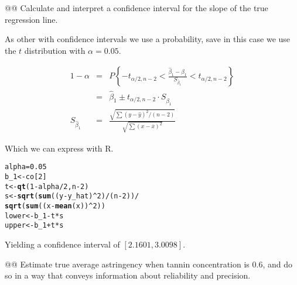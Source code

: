 \documentclass[10pt]{article}\usepackage[]{graphicx}\usepackage[]{xcolor}
\makeatletter
\newcommand{\hlnum}[1]{\textcolor[rgb]{0.686,0.059,0.569}{#1}}%
\newcommand{\hlopt}[1]{\textcolor[rgb]{0,0,0}{#1}}%
\newcommand{\hlstd}[1]{\textcolor[rgb]{0.345,0.345,0.345}{#1}}%
\newcommand{\hlkwb}[1]{\textcolor[rgb]{0.69,0.353,0.396}{#1}}%
\newcommand{\hlkwd}[1]{\textcolor[rgb]{0.737,0.353,0.396}{\textbf{#1}}}%
\newenvironment{kframe}{%
 \def\at@end@of@kframe{}%
 \ifinner\ifhmode%
  \def\at@end@of@kframe{\end{minipage}}%
  \begin{minipage}{\columnwidth}%
 \fi\fi%
 \def\FrameCommand##1{\hskip\@totalleftmargin \hskip-\fboxsep
 \colorbox{shadecolor}{##1}\hskip-\fboxsep
     \hskip-\linewidth \hskip-\@totalleftmargin \hskip\columnwidth}%
 \MakeFramed {\advance\hsize-\width
   \@totalleftmargin\z@ \linewidth\hsize
   \@setminipage}}%
 {\par\unskip\endMakeFramed%
 \at@end@of@kframe}
\newenvironment{knitrout}{}{} %
\makeatother
\begin{document}
\begin{easylist}[enumerate]
    @@ Calculate and interpret a confidence interval for the slope of the true regression line.\newline

    As other with confidence intervals we use a probability, save in this case we use the $t$ distribution with
    $\alpha=0.05$.

    \begin{equation}
        \begin{aligned}
            1 - \alpha &=& P\left\{ -t_{\alpha / 2, n - 2} <
                \frac{\hat{\beta}_1 - \beta_1}{S_{\hat{\beta}_1}} <
                t_{\alpha/2, n - 2} \right\}\\
            &=& \hat{\beta}_1 \pm t_{\alpha / 2, n - 2} \cdot S_{\hat{\beta}_1}\\
            S_{\hat{\beta}_1} &=& \frac{\sqrt{\sum {\left( y - \hat{y} \right)}^2 / (n - 2)}}
                                        {\sqrt{\sum {\left( x - \overline{x} \right)}^2}}
        \end{aligned}
    \end{equation}

    Which we can express with R.

\begin{knitrout}
\color{fgcolor}\begin{kframe}
\begin{alltt}
         \hlstd{alpha} \hlkwb{=} \hlnum{0.05}
         \hlstd{b_1} \hlkwb{<-} \hlstd{co[}\hlnum{2}\hlstd{]}
         \hlstd{t} \hlkwb{<-} \hlkwd{qt}\hlstd{(}\hlnum{1} \hlopt{-} \hlstd{alpha} \hlopt{/} \hlnum{2}\hlstd{, n} \hlopt{-} \hlnum{2}\hlstd{)}
         \hlstd{s} \hlkwb{<-} \hlkwd{sqrt}\hlstd{(}\hlkwd{sum}\hlstd{((y} \hlopt{-} \hlstd{y_hat)}\hlopt{^}\hlnum{2}\hlstd{)} \hlopt{/} \hlstd{(n} \hlopt{-} \hlnum{2}\hlstd{))} \hlopt{/}
                \hlkwd{sqrt}\hlstd{(}\hlkwd{sum}\hlstd{((x} \hlopt{-} \hlkwd{mean}\hlstd{(x))}\hlopt{^}\hlnum{2}\hlstd{))}
         \hlstd{lower} \hlkwb{<-} \hlstd{b_1} \hlopt{-} \hlstd{t} \hlopt{*} \hlstd{s}
         \hlstd{upper} \hlkwb{<-} \hlstd{b_1} \hlopt{+} \hlstd{t} \hlopt{*} \hlstd{s}
\end{alltt}
\end{kframe}
\end{knitrout}


    Yielding a confidence interval of $\boxed{\left[ 2.1601, 3.0098 \right]}$.

    @@ Estimate true average astringency when tannin concentration is 0.6, and do so in a way that conveys information
    about reliability and precision.\newline


\end{easylist}
\end{document}
